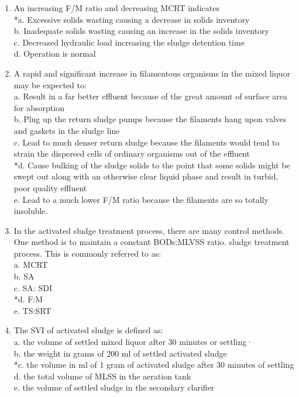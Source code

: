 \begin{enumerate}
\item An increasing F/M ratio and decreasing MCRT indicates \\
*a. Excessive solids wasting causing a decrease in solids inventory \\
b. Inadequate solids wasting causing an increase in the solids inventory \\
c. Decreased hydraulic load increasing the sludge detention time \\
d. Operation is normal \\

\item A rapid and significant increase in filamentous organisms in the mixed liquor may be expected to: \\
a. Result in a far better effluent because of the great amount of surface area for absorption \\
b. Plug up the return sludge pumps because the filaments hang upon valves and gaskets in the sludge line \\
c. Lead to much denser return sludge because the filaments would tend to strain the dispersed cells of ordinary organisms out of the effluent \\
*d. Cause bulking of the sludge solids to the point that some solids might be swept out along with an otherwise clear liquid phase and result in turbid, poor quality effluent \\
e. Lead to a much lower F/M ratio because the filaments are so totally insoluble. \\

\item In the activated sludge treatment process, there are many control methods. One method is to maintain a constant BODs:MLVSS ratio. sludge treatment process.  This is commonly referred to as: \\
a. MCRT \\
b. SA \\
c. SA: SDI \\
*d. F:M \\
e. TS:SRT \\

\item The SVI of activated sludge is defined as: \\
a. the volume of settled mixed liquor after 30 minutes or settling· \\
b. the weight in grams of 200 ml of settled activated sludge \\
*c. the volume in ml of 1 gram of activated sludge after 30 minutes of settling \\
d. the total volume of MLSS in the aeration tank \\
e. the volume of settled sludge in the secondary clarifier \\


\end{enumerate}
